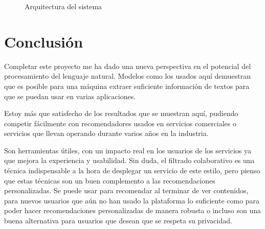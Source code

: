 \documentclass[withindex, glossary]{cam-thesis}
\begin{document}
\begin{figure}[!htbp]
    \centering
    \caption{Arquitectura del sistema}\label{arch}
\end{figure}

\chapter{Conclusión}
Completar este proyecto me ha dado una nueva perspectiva en el potencial del procesamiento del lenguaje natural. Modelos como los usados aquí demuestran que es posible para una máquina extraer suficiente información de textos para que se puedan usar en varias aplicaciones.

Estoy más que satisfecho de los resultados que se muestran aquí, pudiendo competir fácilmente con recomendadores usados en servicios comerciales o servicios que llevan operando durante varios años en la industria.

Son herramientas útiles, con un impacto real en los usuarios de los servicios ya que mejora la experiencia y usabilidad. Sin duda, el filtrado colaborativo es una técnica indispensable a la hora de desplegar un servicio de este estilo, pero pienso que estas técnicas son un buen complemento a las recomendaciones personalizadas. Se puede usar para recomendar al terminar de ver contenidos, para nuevos usuarios que aún no han usado la plataforma lo suficiente como para poder hacer recomendaciones personalizadas de manera robusta o incluso son una buena alternativa para usuarios que desean que se respeta su privacidad.
\end{document}

